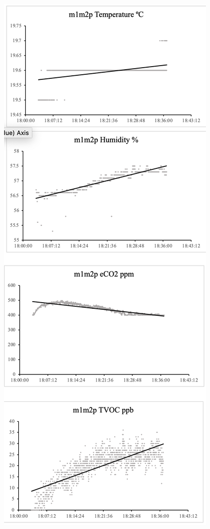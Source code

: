 \documentclass{ueacmpstyle}
\begin{document}
            \includegraphics[scale=0.3]{Images/m1m2p.png}
\end{document}
